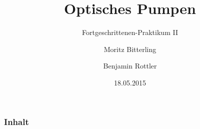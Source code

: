 \documentclass{beamer}
\title{Optisches Pumpen}
\subtitle{Fortgeschrittenen-Praktikum II}
\author{Moritz Bitterling \and Benjamin Rottler}
\institute[Universities of]{Universität Freiburg}
\date{18.05.2015}
\numberwithin{equation}{section} %
\numberwithin{table}{section}    %
\begin{document}
\begin{frame}
\titlepage
\end{frame}

\begin{frame}
\frametitle{Inhalt}
\tableofcontents[hideallsubsections]
\end{frame}


%





%
\end{document}
